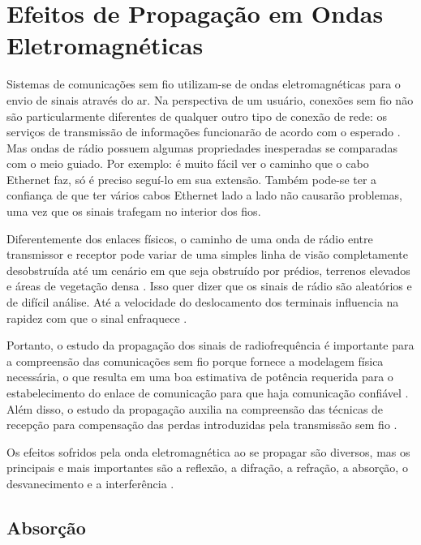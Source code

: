 \section{Efeitos de Propagação em Ondas Eletromagnéticas}
\label{sec:efeitos-propagacao-OE}

Sistemas de comunicações sem fio utilizam-se de ondas eletromagnéticas para o envio de sinais através do ar. Na perspectiva de um usuário, conexões sem fio não são particularmente diferentes de qualquer outro tipo de conexão de rede: os serviços de transmissão de informações funcionarão de acordo com o esperado \cite{flickenger2008}. Mas ondas de rádio possuem algumas propriedades inesperadas se comparadas com o meio guiado.  Por exemplo: é muito fácil ver o caminho que o cabo Ethernet faz, só é preciso seguí-lo em sua extensão. Também pode-se ter a confiança de que ter vários cabos Ethernet lado a lado não causarão problemas, uma vez que os sinais trafegam no interior dos fios.

Diferentemente dos enlaces físicos, o caminho de uma onda de rádio entre transmissor e receptor pode variar de uma simples linha de visão completamente desobstruída até um cenário em que seja obstruído por prédios, terrenos elevados e áreas de vegetação densa \cite{rappaport2009}. Isso quer dizer que os sinais de rádio são aleatórios e de difícil análise. Até a velocidade do deslocamento dos terminais influencia na rapidez com que o sinal enfraquece \cite{rappaport2009}.

Portanto, o estudo da propagação dos sinais de radiofrequência é importante para a compreensão das comunicações sem fio porque fornece a modelagem física necessária, o que resulta em uma boa estimativa de potência requerida para o estabelecimento do enlace de comunicação para que haja comunicação confiável \cite{haykin2009}. Além disso, o estudo da propagação auxilia na compreensão das técnicas de recepção para compensação das perdas introduzidas pela transmissão sem fio \cite{haykin2009}.

Os efeitos sofridos pela onda eletromagnética ao se propagar são diversos, mas os principais e mais importantes são a reflexão, a difração, a refração, a absorção, o desvanecimento e a interferência \cite{flickenger2008,haykin2009,rappaport2009}.

\subsection{Absorção}
\label{sub:absorcao}


